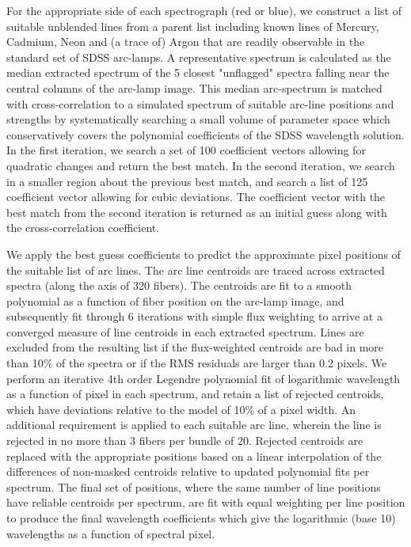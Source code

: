 \documentclass[12pt,preprint]{aastex}
\begin{document}
For the appropriate side of each spectrograph (red or blue), we 
construct a list of suitable unblended lines from a parent list including
known lines of Mercury, Cadmium, Neon and (a trace of) Argon 
that are readily observable in the standard set of SDSS arc-lamps. 
A representative spectrum is calculated as the median extracted spectrum
of the 5 closest "unflagged" spectra falling near the central columns 
of the arc-lamp image.  This median arc-spectrum is matched with 
cross-correlation to a simulated spectrum of suitable arc-line positions and 
strengths by systematically searching a small volume of 
parameter space which conservatively covers
the polynomial coefficients of the SDSS wavelength solution.
In the first iteration, we search a set of 
100 coefficient vectors allowing for quadratic changes and return 
the best match.  In the second iteration, we search in a smaller region
about the previous best match, and search a list of 125 coefficient vector
allowing for cubic deviations.  The coefficient vector with the best
match from the second iteration is returned as an initial guess along with
the cross-correlation coefficient.  

We apply the best guess coefficients to predict the approximate pixel 
positions of the suitable list of arc lines.  The arc line centroids
are traced across extracted spectra (along the axis of 320 fibers).
The centroids are fit to a smooth polynomial as a function of fiber
position on the arc-lamp image, and subsequently fit through 6 iterations
with simple flux weighting to arrive at a converged measure of line 
centroids in each extracted spectrum.  Lines are excluded from the resulting
list if the flux-weighted centroids are bad in more than 10\% of the
spectra or if the RMS residuals are larger than 0.2 pixels.
We perform an iterative 4th order Legendre polynomial fit of 
logarithmic wavelength as a function of pixel in each spectrum, 
and retain a list of rejected centroids, 
which have deviations relative to the model of
10\% of a pixel width.  An additional requirement is applied to each
suitable arc line, wherein the line is rejected in no more than 3 fibers
per bundle of 20.  Rejected centroids are replaced with the appropriate
positions based on a linear interpolation of the differences of non-masked
centroids relative to updated polynomial fits per spectrum.
The final set of positions, where the same number of line positions have
reliable centroids per spectrum, are fit with equal weighting per line
position to produce the final wavelength
coefficients which give the logarithmic (base 10) wavelengths as a function
of spectral pixel.
\end{document}
